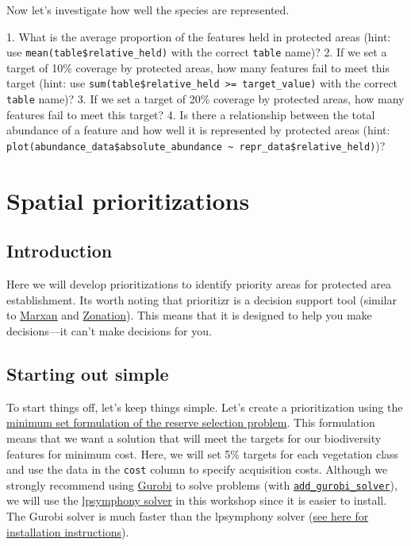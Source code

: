 \documentclass[12pt,]{book}
\makeatletter
\newenvironment{kframe}{%
\medskip{}
\setlength{\fboxsep}{.8em}
 \def\at@end@of@kframe{}%
 \ifinner\ifhmode%
  \def\at@end@of@kframe{\end{minipage}}%
  \begin{minipage}{\columnwidth}%
 \fi\fi%
 \def\FrameCommand##1{\hskip\@totalleftmargin \hskip-\fboxsep
 \colorbox{shadecolor}{##1}\hskip-\fboxsep
     \hskip-\linewidth \hskip-\@totalleftmargin \hskip\columnwidth}%
 \MakeFramed {\advance\hsize-\width
   \@totalleftmargin\z@ \linewidth\hsize
   \@setminipage}}%
 {\par\unskip\endMakeFramed%
 \at@end@of@kframe}
\newenvironment{rmdblock}[1]
  {
  \begin{itemize}
  \renewcommand{\labelitemi}{
    \raisebox{-.7\height}[0pt][0pt]{
      {\setkeys{Gin}{width=3em,keepaspectratio}\texttt{[image: images/\#1]}}
    }
  }
  \setlength{\fboxsep}{1em}
  \begin{kframe}
  \item
  }
  {
  \end{kframe}
  \end{itemize}
  }
\newenvironment{rmdquestion}
  {\begin{rmdblock}{question}}
  {\end{rmdblock}}
\makeatother
\begin{document}
Now let's investigate how well the species are represented.

\begin{rmdquestion} 1. What is the average proportion of the
features held in protected areas (hint: use
\texttt{mean(table\$relative\_held)} with the correct \texttt{table}
name)? 2. If we set a target of 10\% coverage by protected areas, how
many features fail to meet this target (hint: use
\texttt{sum(table\$relative\_held\ \textgreater{}=\ target\_value)} with
the correct \texttt{table} name)? 3. If we set a target of 20\% coverage
by protected areas, how many features fail to meet this target? 4. Is
there a relationship between the total abundance of a feature and how
well it is represented by protected areas (hint:
\texttt{plot(abundance\_data\$absolute\_abundance\ \textasciitilde{}\ repr\_data\$relative\_held)})?
\end{rmdquestion}

\chapter{Spatial prioritizations}\label{spatial-prioritizations}

\section{Introduction}\label{introduction-2}

Here we will develop prioritizations to identify priority areas for
protected area establishment. Its worth noting that prioritizr is a
decision support tool (similar to \href{http://marxan.org/}{Marxan} and
\href{https://www.helsinki.fi/en/researchgroups/digital-geography-lab/software-developed-in-cbig\#section-52992}{Zonation}).
This means that it is designed to help you make decisions---it can't
make decisions for you.

\section{Starting out simple}\label{starting-out-simple}

To start things off, let's keep things simple. Let's create a
prioritization using the
\href{https://prioritizr.net/reference/add_min_set_objective.html}{minimum
set formulation of the reserve selection problem}. This formulation
means that we want a solution that will meet the targets for our
biodiversity features for minimum cost. Here, we will set 5\% targets
for each vegetation class and use the data in the \texttt{cost} column
to specify acquisition costs. Although we strongly recommend using
\href{https://www.gurobi.com/}{Gurobi} to solve problems (with
\href{https://prioritizr.net/reference/add_gurobi_solver.html}{\texttt{add\_gurobi\_solver}}),
we will use the
\href{https://prioritizr.net/reference/add_lpsymphony_solver.html}{lpsymphony
solver} in this workshop since it is easier to install. The Gurobi
solver is much faster than the lpsymphony solver
(\href{https://prioritizr.net/articles/gurobi_installation.html}{see
here for installation instructions}).
\end{document}
